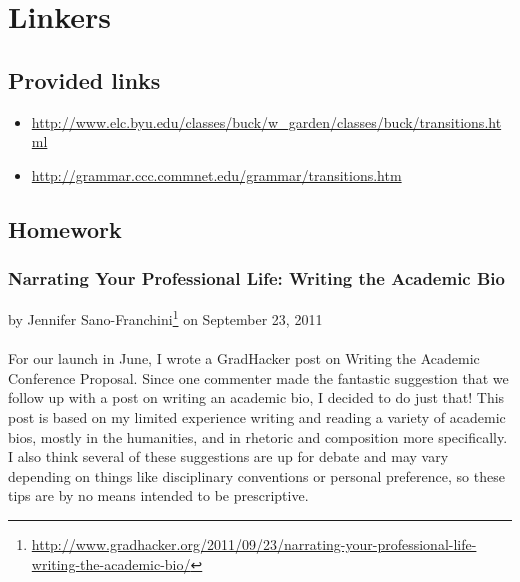 
\chapter{Linkers}

\section{Provided links}

\begin{itemize}
    \item \url{http://www.elc.byu.edu/classes/buck/w_garden/classes/buck/transitions.html}
    \item \url{http://grammar.ccc.commnet.edu/grammar/transitions.htm}
\end{itemize}

\section{Homework}

\subsection{Narrating Your Professional Life: Writing the Academic Bio}

by Jennifer Sano-Franchini\footnote{\url{http://www.gradhacker.org/2011/09/23/narrating-your-professional-life-writing-the-academic-bio/}} on September 23, 2011\\\\
For our launch in June, I wrote a GradHacker post on Writing the Academic Conference Proposal. Since one commenter made the fantastic suggestion that we follow up with a post on writing an academic bio, I decided to do just that! This post is based on my limited experience writing and reading a variety of academic bios, mostly in the humanities, and in rhetoric and composition more specifically. I also think several of these suggestions are up for debate and may vary depending on things like disciplinary conventions or personal preference, so these tips are by no means intended to be prescriptive.



